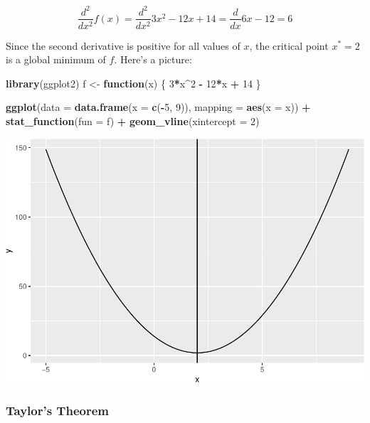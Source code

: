\documentclass[]{article}
\newenvironment{Shaded}{\begin{snugshade}}{\end{snugshade}}
\newcommand{\KeywordTok}[1]{\textcolor[rgb]{0.13,0.29,0.53}{\textbf{#1}}}
\newcommand{\DataTypeTok}[1]{\textcolor[rgb]{0.13,0.29,0.53}{#1}}
\newcommand{\DecValTok}[1]{\textcolor[rgb]{0.00,0.00,0.81}{#1}}
\newcommand{\StringTok}[1]{\textcolor[rgb]{0.31,0.60,0.02}{#1}}
\newcommand{\ControlFlowTok}[1]{\textcolor[rgb]{0.13,0.29,0.53}{\textbf{#1}}}
\newcommand{\OperatorTok}[1]{\textcolor[rgb]{0.81,0.36,0.00}{\textbf{#1}}}
\newcommand{\NormalTok}[1]{#1}
\begin{document}
\[\frac{d^2}{dx^2} f(x) = \frac{d^2}{dx^2} 3x^2 - 12x + 14 = \frac{d}{dx} 6x - 12 = 6\]

Since the second derivative is positive for all values of \(x\), the
critical point \(x^* = 2\) is a global minimum of \(f\). Here's a
picture:

\begin{Shaded}
\begin{Highlighting}[]
\KeywordTok{library}\NormalTok{(ggplot2)}
\NormalTok{f <-}\StringTok{ }\ControlFlowTok{function}\NormalTok{(x) \{}
  \DecValTok{3}\OperatorTok{*}\NormalTok{x}\OperatorTok{^}\DecValTok{2} \OperatorTok{-}\StringTok{ }\DecValTok{12}\OperatorTok{*}\NormalTok{x }\OperatorTok{+}\StringTok{ }\DecValTok{14}
\NormalTok{\}}

\KeywordTok{ggplot}\NormalTok{(}\DataTypeTok{data =} \KeywordTok{data.frame}\NormalTok{(}\DataTypeTok{x =} \KeywordTok{c}\NormalTok{(}\OperatorTok{-}\DecValTok{5}\NormalTok{, }\DecValTok{9}\NormalTok{)), }\DataTypeTok{mapping =} \KeywordTok{aes}\NormalTok{(}\DataTypeTok{x =}\NormalTok{ x)) }\OperatorTok{+}
\StringTok{  }\KeywordTok{stat_function}\NormalTok{(}\DataTypeTok{fun =}\NormalTok{ f) }\OperatorTok{+}
\StringTok{  }\KeywordTok{geom_vline}\NormalTok{(}\DataTypeTok{xintercept =} \DecValTok{2}\NormalTok{)}
\end{Highlighting}
\end{Shaded}

\includegraphics{calculus_files/figure-latex/unnamed-chunk-1-1.pdf}

\subsubsection{Taylor's Theorem}\label{taylors-theorem}
\end{document}
